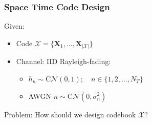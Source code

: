 \documentclass[a4paper, 10pt]{article}
\begin{document}
\subsubsection{Space Time Code Design}
Given: 
\begin{itemize}
	\item Code  $\mathscr{X} = \bigl\{\textbf{X}_1,\dots ,\textbf{X}_{|\mathscr{X}|}\bigr\}$
	\item Channel: IID Rayleigh-fading: 
	\begin{itemize}
		\item $h_n \sim \text{C}\mathcal{N}(0,1);\quad n \in \{1, 2, \dots , N_T \} $
		\item AWGN $ n \sim \text{C}\mathcal{N}(0,\sigma _n^2) $
	\end{itemize}
\end{itemize}
Problem: How should we design codebook $\mathscr{X}$?
\end{document}
